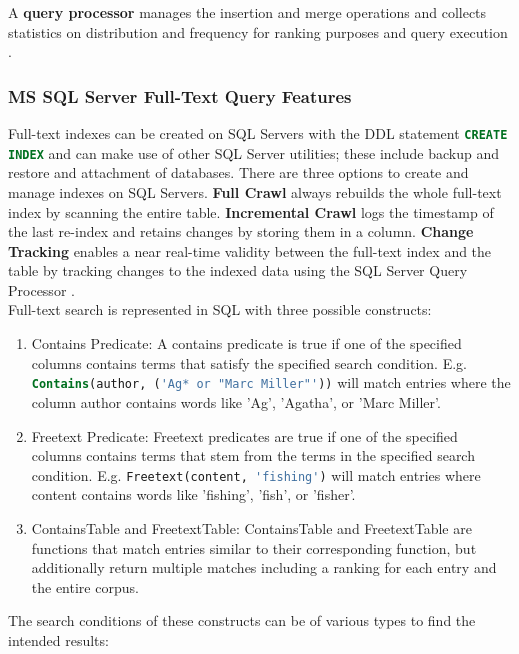 A \textbf{query processor} manages the insertion and merge operations and collects statistics on distribution and frequency for ranking purposes and query execution \parencite[cf.][pp. 8-9]{hamilton_microsoft_2001}.
\subsubsection{MS SQL Server Full-Text Query Features}
Full-text indexes can be created on \ac{SQL} Servers with the \ac{DDL} statement \lstinline[language=SQL]$CREATE INDEX$ and can make use of other \ac{SQL} Server utilities; these include backup and restore and attachment of databases. There are three options to create and manage indexes on \ac{SQL} Servers. \textbf{Full Crawl} always rebuilds the whole full-text index by scanning the entire table. \textbf{Incremental Crawl} logs the timestamp of the last re-index and retains changes by storing them in a column. \textbf{Change Tracking} enables a near real-time validity between the full-text index and the table by tracking changes to the indexed data using the \ac{SQL} Server Query Processor \parencite[cf.][p. 9]{hamilton_microsoft_2001}.\\
Full-text search is represented in \ac{SQL} with three possible constructs: \parencite[cf.][p. 9]{hamilton_microsoft_2001}
\begin{enumerate}
    \item Contains Predicate: A contains predicate is true if one of the specified columns contains terms that satisfy the specified search condition. E.g. \lstinline[language=SQL]$Contains(author, ('Ag* or "Marc Miller"'))$ will match entries where the column author contains words like 'Ag', 'Agatha', or 'Marc Miller'.
    \item Freetext Predicate: Freetext predicates are true if one of the specified columns contains terms that stem from the terms in the specified search condition. E.g. \lstinline[language=SQL]$Freetext(content, 'fishing')$ will match entries where content contains words like 'fishing', 'fish', or 'fisher'.
    \item ContainsTable and FreetextTable: ContainsTable and FreetextTable are functions that match entries similar to their corresponding function, but additionally return multiple matches including a ranking for each entry and the entire corpus.
\end{enumerate}
The search conditions of these constructs can be of various types to find the intended results: \parencite[cf.][p. 9]{hamilton_microsoft_2001}
